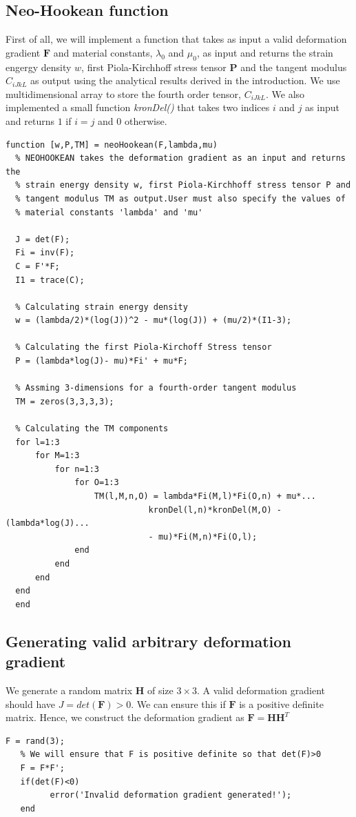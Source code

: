 \message{ !name(p2.tex)}\documentclass[../main.tex]{subfiles}
\begin{document}
\subsection{Neo-Hookean function}
First of all, we will implement a function that takes as input a valid
deformation gradient $\mathbf{F}$ and material constants, $\lambda_0$
and $\mu_0$, as input and returns the strain engergy density $w$,
first Piola-Kirchhoff stress tensor $\mathbf{P}$ and the tangent
modulus $C_{iJkL}$ as output using the analytical results derived in
the introduction. We use multidimensional array to store the fourth
order tensor, $C_{iJkL}$. We also implemented a small function
\textit{kronDel()} that takes two indices $i$ and $j$ as input and
returns $1$ if $i=j$ and $0$ otherwise.
\begin{lstlisting}[style=Matlab-editor]
  function [w,P,TM] = neoHookean(F,lambda,mu)
  % NEOHOOKEAN takes the deformation gradient as an input and returns the
  % strain energy density w, first Piola-Kirchhoff stress tensor P and
  % tangent modulus TM as output.User must also specify the values of
  % material constants 'lambda' and 'mu'
  
  J = det(F);
  Fi = inv(F);
  C = F'*F;
  I1 = trace(C);
  
  % Calculating strain energy density
  w = (lambda/2)*(log(J))^2 - mu*(log(J)) + (mu/2)*(I1-3);
  
  % Calculating the first Piola-Kirchoff Stress tensor
  P = (lambda*log(J)- mu)*Fi' + mu*F;
  
  % Assming 3-dimensions for a fourth-order tangent modulus
  TM = zeros(3,3,3,3);
  
  % Calculating the TM components
  for l=1:3
      for M=1:3
          for n=1:3
              for O=1:3
                  TM(l,M,n,O) = lambda*Fi(M,l)*Fi(O,n) + mu*...
                             kronDel(l,n)*kronDel(M,O) - (lambda*log(J)...
                             - mu)*Fi(M,n)*Fi(O,l);
              end
          end
      end
  end
  end
\end{lstlisting}

\subsection{Generating valid arbitrary deformation gradient}
We generate a random matrix $\mathbf{H}$ of size $3\times 3$. A valid
deformation gradient should have $J = det(\mathbf{F}) > 0$. We can
ensure this if $\mathbf{F}$ is a positive definite matrix. Hence, we
construct the deformation gradient as $\mathbf{F} = \mathbf{HH}^T$
 \begin{lstlisting}[style=Matlab-editor]
   F = rand(3);
   % We will ensure that F is positive definite so that det(F)>0
   F = F*F';
   if(det(F)<0)
         error('Invalid deformation gradient generated!');
   end
 \end{lstlisting}
\end{document}
